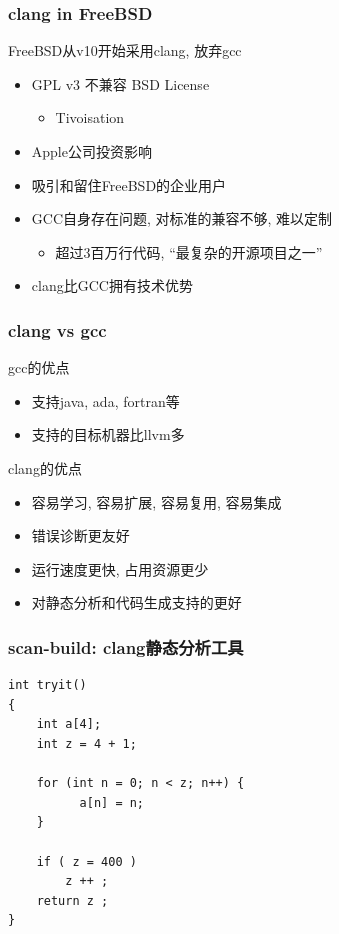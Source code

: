 \documentclass[compress]{beamer}
\begin{document}
\begin{frame}
    \frametitle{clang in FreeBSD}
    \noindent FreeBSD从v10开始采用clang, 放弃gcc
    \begin{itemize}
        \item GPL v3 不兼容 BSD License
            \begin{itemize}
                \item Tivoisation
            \end{itemize}
        \item Apple公司投资影响
        \item 吸引和留住FreeBSD的企业用户
        \item GCC自身存在问题, 对标准的兼容不够, 难以定制
            \begin{itemize}
                \item 超过3百万行代码, ``最复杂的开源项目之一''
            \end{itemize}
        \item clang比GCC拥有技术优势
    \end{itemize}
\end{frame}

\begin{frame}
    \frametitle{clang vs gcc}
    \noindent gcc的优点
    \begin{itemize}
        \item 支持java, ada, fortran等
        \item 支持的目标机器比llvm多
    \end{itemize}
    \noindent clang的优点
    \begin{itemize}
        \item 容易学习, 容易扩展, 容易复用, 容易集成
        \item 错误诊断更友好
        \item 运行速度更快, 占用资源更少
        \item 对静态分析和代码生成支持的更好
    \end{itemize}
\end{frame}

\begin{frame}[fragile]
    \frametitle{scan-build: clang静态分析工具}
\begin{lstlisting}
int tryit() 
{
    int a[4];
    int z = 4 + 1;

    for (int n = 0; n < z; n++) {
          a[n] = n;
    }

    if ( z = 400 )
        z ++ ;
    return z ;
}
\end{lstlisting}
\end{frame}
\end{document}

